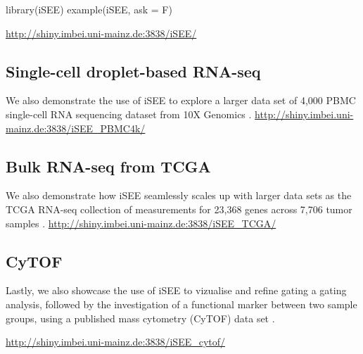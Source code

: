 \documentclass[10pt,a4paper,twocolumn]{article}
\begin{document}
library(iSEE)
example(iSEE, ask = F)

\url{http://shiny.imbei.uni-mainz.de:3838/iSEE/}

\subsection*{Single-cell droplet-based RNA-seq}
We also demonstrate the use of iSEE to explore a larger data set of 4,000 PBMC single-cell RNA sequencing dataset from 10X Genomics \citep{zheng2017massively}.
\url{http://shiny.imbei.uni-mainz.de:3838/iSEE_PBMC4k/}

\subsection*{Bulk RNA-seq from TCGA}
We also demonstrate how iSEE seamlessly scales up with larger data sets as the TCGA RNA-seq collection of measurements for 23,368 genes across 7,706 tumor samples \citep{piccolo2015TCGA}.
\url{http://shiny.imbei.uni-mainz.de:3838/iSEE_TCGA/}

\subsection*{CyTOF}
Lastly, we also showcase the use of iSEE to vizualise and refine gating a gating analysis, followed by the investigation of a functional marker between two sample groups, using a published mass cytometry (CyTOF) data set \citep{bodenmiller2012cytof}.

\url{http://shiny.imbei.uni-mainz.de:3838/iSEE_cytof/}
\end{document}
